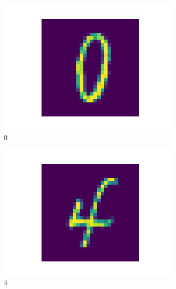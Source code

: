 \documentclass[letterpaper]{article} %
\begin{document}
\begin{figure}[htbp]
\centering
\begin{subfigure}{0.115\textwidth}
  \includegraphics[width=\linewidth]{mnist_0.png}
  \caption{0}
\end{subfigure}\hfil
\begin{subfigure}{0.115\textwidth}
  \includegraphics[width=\linewidth]{mnist_4.png}
  \caption{4}
\end{subfigure}\hfil
\begin{subfigure}{0.115\textwidth}

\end{subfigure}
\end{figure}
\end{document}
